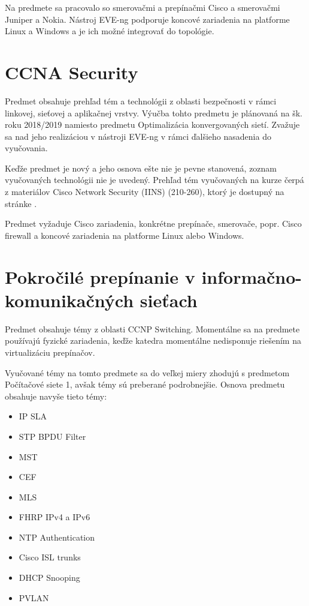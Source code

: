 Na predmete sa pracovalo so smerovačmi a prepínačmi Cisco a smerovačmi Juniper a Nokia. Nástroj EVE-ng podporuje koncové zariadenia na platforme Linux a Windows a je ich možné integrovať do topológie.




\section{CCNA Security}
  
Predmet obsahuje prehľad tém a technológii z oblasti bezpečnosti v rámci linkovej, sieťovej a aplikačnej vrstvy. Výučba tohto predmetu je plánovaná na šk. roku 2018/2019 namiesto predmetu Optimalizácia konvergovaných sietí. Zvažuje sa nad jeho realizáciou v nástroji EVE-ng v rámci ďalšieho nasadenia do vyučovania.

Keďže predmet je nový a jeho osnova ešte nie je pevne stanovená, zoznam vyučovaných technológii nie je uvedený. Prehľad tém vyučovaných na kurze čerpá z materiálov Cisco Network Security (IINS) (210-260), ktorý je dostupný na stránke \cite{ccna_security_topics}.

Predmet vyžaduje Cisco zariadenia, konkrétne prepínače, smerovače, popr. Cisco firewall a koncové zariadenia na platforme Linux alebo Windows.





\section{Pokročilé prepínanie v informačno-komunikačných sieťach}

Predmet obsahuje témy z oblasti CCNP Switching. Momentálne sa na predmete používajú fyzické zariadenia, keďže katedra momentálne nedisponuje riešením na virtualizáciu prepínačov.

Vyučované témy na tomto predmete sa do veľkej miery zhodujú s predmetom Počítačové siete 1, avšak témy sú preberané podrobnejšie. Osnova predmetu obsahuje navyše tieto témy:

\begin{itemize}[noitemsep]
    \item IP SLA
    \item STP BPDU Filter
    \item MST
    \item CEF
    \item MLS
    \item FHRP IPv4 a IPv6 
    \item NTP Authentication
    \item Cisco ISL trunks
    \item DHCP Snooping
    \item PVLAN
\end{itemize}

